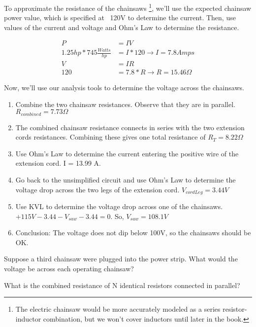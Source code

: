 To approximate the resistance of the chainsaws \footnote{The electric chainsaw would be more accurately modeled as a series resistor-inductor combination, but we won't cover inductors until later in the book.}, we'll use the expected chainsaw power value, which is specified at ~120V to determine the current. Then, use values of the current and voltage and Ohm's Law to determine the resistance.
\par

\begin{align*}
P&=IV\\
1.25hp*745 \frac{Watts}{hp}&= I*120 \rightarrow I=7.8 Amps\\
V &= IR \\
120 &= 7.8*R \rightarrow R = 15.46 \Omega
\end{align*}

Now, we'll use our analysis tools to determine the voltage across the chainsaws.

\begin{enumerate}
\item Combine the two chainsaw resistances. Observe that they are in parallel. $R_{combined} = 7.73 \Omega$
\item The combined chainsaw resistance connects in series with the two extension cords resistances. Combining these gives one total resistance of $R_T=8.22 \Omega$
\item Use Ohm's Law to determine the current entering the positive wire of the extension cord. I = 13.99 A.
\item Go back to the unsimplified circuit and use Ohm's Law to determine the voltage drop across the two legs of the extension cord. $V_{cordLeg} =3.44 V$
\item Use KVL to determine the voltage drop across one of the chainsaws. $+115V - 3.44 - V_{saw} - 3.44 = 0$. So, $V_{saw}=108.1 V$ 
\item Conclusion: The voltage does not dip below 100V, so the chainsaws should be OK.
\end{enumerate}

\begin{blevel}
Suppose a third chainsaw were plugged into the power strip. What would the voltage be across each operating chainsaw?
\end{blevel}

\begin{clevel}
What is the combined resistance of N identical resistors connected in parallel?
\end{clevel}

